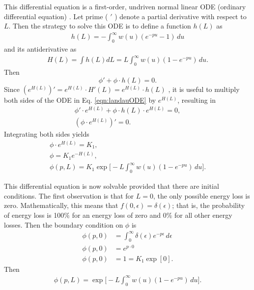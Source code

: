 This differential equation is a first-order, undriven normal linear ODE (ordinary differential equation) \cite{Borrelli}. Let prime ( $'$ ) denote a partial derivative with respect to $L$. Then the strategy to solve this ODE is to define a function $h(L)$ as
%
\begin{gather*}
h(L)=-\int_0 ^\infty w(u)  (e^{-pu}-1)\, du
\end{gather*}
and its antiderivative as
\begin{gather*}
H(L)=\int h(L) dL=L \int_0 ^\infty w(u)  (1-e^{-pu})\, du.
\end{gather*}
Then
\begin{equation}\label{eqn:landauODE}
\phi ' + \phi \cdot h(L) = 0.
\end{equation}
%
Since $(e^{H(L)}) ' = e^{H(L)}\cdot H'(L)= e^{H(L)}\cdot h(L)$ , it is useful to multiply both sides of the ODE in Eq. \eqref{eqn:landauODE} by $e^{H(L)}$, resulting in
\begin{gather*}
\phi ' \cdot e^{H(L)}+ \phi \cdot h(L) \cdot e^{H(L)} = 0,\\
(\phi\cdot e^{H(L)}) ' = 0.
\end{gather*}
Integrating both sides yields
\begin{gather*}
\phi\cdot e^{H(L)}=K_1,\\
\phi = K_1 e^{-H(L)},\\
\phi(p,L)=K_1 \exp\Big[-L\int_0 ^\infty w(u)  (1-e^{-pu})\, du\Big].
\end{gather*}

This differential equation is now solvable provided that there are initial conditions. The first observation is that for $L=0$, the only possible energy loss is zero. Mathematically, this means that $f(0,\epsilon)=\delta(\epsilon)$; that is, the probability of energy loss is 100\% for an energy loss of zero and 0\% for all other energy losses. Then the boundary condition on $\phi$ is
\begin{align}
\phi(p,0)&=\int_0 ^\infty \delta(\epsilon) e^{-p\epsilon}\, d\epsilon\nonumber\\
\phi(p,0)&=e^{p\cdot 0}\nonumber\\
\phi(p,0)&=1=K_1\exp[0].\nonumber%
\end{align}
Then
\begin{gather*}
\phi(p,L)=\exp\Big[-L\int_0 ^\infty w(u)  (1-e^{-pu})\, du\Big].
\end{gather*}

